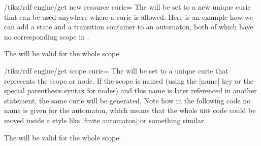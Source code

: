 \begin{key}{/tikz/rdf engine/get new resource curie=}
    The  will be set to a new unique curie that can be used
    anywhere where a curie is allowed. Here is an example how we can add a
    state and a transition container to an automaton, both of which have no
    corresponding scope in \tikzname.
\begin{codeexample}
\end{codeexample}
    The  will be valid for the whole scope.
\end{key}

\begin{key}{/tikz/rdf engine/get scope curie=}
    The  will be set to a unique curie that represents the scope or
    node. If the scope is named (using the |name| key or the special
    parenthesis syntax for nodes) and this name is later referenced in another
    statement, the same curie will be generated. Note how in the following code
    no name is given for the automaton, which means that the whole \textsc{rdf}
    code could be moved inside a style like |finite automaton| or something
    similar.
\begin{codeexample}
\end{codeexample}
    The  will be valid for the whole scope.
\end{key}

